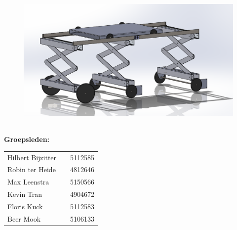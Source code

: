 \begin{titlepage}

\begin{center}

\vspace*{\bigskipamount}

{\makeatletter
\titlestyle\bfseries\LARGE\@title
\makeatother}

{\makeatletter
\ifx\@subtitle\undefined\else
    \bigskip
    \titlefont\titleshape\Large\@subtitle
\fi
\makeatother}

\vspace{\baselineskip} %

\begin{figure}[h]
    \centering
    \includegraphics[height =70mm]{04_gekozenconcept/eindconcept.png}
    \label{fig:title_image}
\end{figure}


\end{center}

\begin{flushleft}

\bfseries Groepsleden: \mdseries
\begin{table}[h]
    \begin{tabular}{lll}
        Hilbert Bijzitter &  & 5112585 \\
        Robin ter Heide &  & 4812646 \\
        Max Leenstra &  &5150566 \\
        Kevin Tran &  & 4904672 \\
        Floris Kuck &  & 5112583 \\
        Beer Mook &  & 5106133
    \end{tabular}
\end{table}


\end{flushleft}
\end{titlepage}
